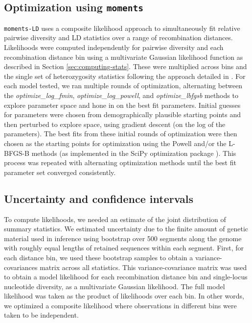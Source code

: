 \documentclass[]{article}
\newcommand{\moments}{\texttt{moments}\xspace}
\begin{document}
\subsection{Optimization using \moments}
\label{sec:optimization}

\texttt{moments-LD} uses a composite likelihood approach to simultaneously fit relative
pairwise diversity and LD statistics over a range of recombination distances.
Likelihoods were computed independently for pairwise diversity and each
recombination distance bin using a multivariate Gaussian likelihood function as
described in Section \ref{sec:computing-stats}. These were multiplied across
bins and the single set of heterozygosity statistics following the approach
detailed in \citet{Ragsdale2019-nt}. For each model tested, we ran multiple
rounds of optimization, alternating between the \emph{optimize\_log\_fmin},
\emph{optimize\_log\_powell}, and \emph{optimize\_lbfgsb} methods to explore
parameter space and hone in on the best fit parameters. Initial guesses for
parameters were chosen from demographically plausible starting points and then
perturbed to explore space, using gradient descent (on the log of the
parameters). The best fits from these initial rounds of optimization were then
chosen as the starting points for optimization using the Powell and/or the
L-BFGS-B methods (as implemented in the SciPy optimization package
\citep{Virtanen2020-kr}). This process was repeated with alternating
optimization methods until the best fit parameter set converged consistently.

\subsection{Uncertainty and confidence intervals}

To compute likelihoods, we needed an estimate of the joint
distribution of summary statistics. 
We estimated uncertainty due to the finite amount of genetic material
used in inference using bootstrap over 500 segments along the genome with
roughly equal lengths of retained sequences within each segment. First, for
each distance bin, we used these bootstrap samples to obtain a
variance-covariances matrix across all statistics. This variance-covariance
matrix was used to obtain a model likelihood for each recombination distance
bin and single-locus nucleotide diversity, as a multivariate Gaussian
likelihood. The full model likelihood was taken as the product of likelihoods
over each bin. In other words, we optimized a composite likelihood where
observations in different bins were taken to be independent. 
\end{document}
